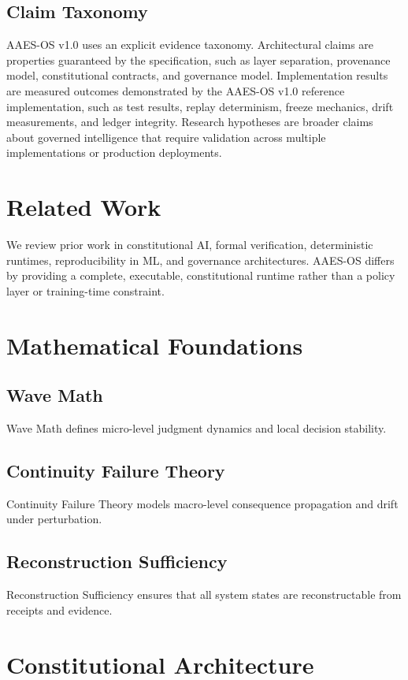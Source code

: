 \documentclass{article}
\begin{document}
\subsection{Claim Taxonomy}
AAES-OS v1.0 uses an explicit evidence taxonomy. Architectural claims are properties guaranteed by the specification, such as layer separation, provenance model, constitutional contracts, and governance model. Implementation results are measured outcomes demonstrated by the AAES-OS v1.0 reference implementation, such as test results, replay determinism, freeze mechanics, drift measurements, and ledger integrity. Research hypotheses are broader claims about governed intelligence that require validation across multiple implementations or production deployments.

\section{Related Work}
We review prior work in constitutional AI, formal verification, deterministic runtimes, reproducibility in ML, and governance architectures. AAES-OS differs by providing a complete, executable, constitutional runtime rather than a policy layer or training-time constraint.

\section{Mathematical Foundations}
\subsection{Wave Math}
Wave Math defines micro-level judgment dynamics and local decision stability.

\subsection{Continuity Failure Theory}
Continuity Failure Theory models macro-level consequence propagation and drift under perturbation.

\subsection{Reconstruction Sufficiency}
Reconstruction Sufficiency ensures that all system states are reconstructable from receipts and evidence.

\section{Constitutional Architecture}
\end{document}
